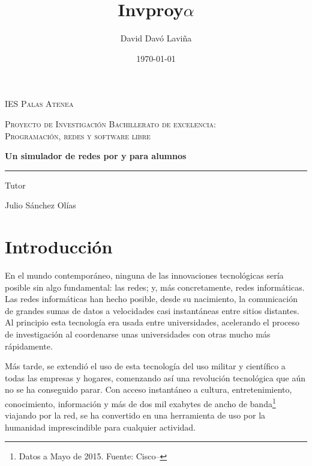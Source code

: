 \documentclass[a4paper, 11pt]{report} %
\title{Invproy\space $\alpha$}
\author{David Davó Laviña}
\date{\today{}}
\begin{document}

\makeatletter
\begin{titlepage}
\centering
\vspace*{4cm}
{\scshape\LARGE IES Palas Atenea \par}
\vspace{1cm}
{\scshape\Large Proyecto de Investigación Bachillerato de excelencia:\\
Programación, redes y software libre\par}
\vspace{1.5cm}
{\fontsize{35pt}{40pt}\bfseries\color{DarkRed} \@title\par}
{\huge\bfseries Un simulador de redes por y para alumnos \par}
\rule{0.5\textwidth}{1pt}\par
\vspace{2cm}
{\Large\itshape \@author\par}
\vfill
Tutor\par
Julio Sánchez Olías

\vfill

{\large \@date\par}
\end{titlepage}
\clearpage
{}

\tableofcontents
{}
\newpage{}
\setlength{\parskip}{5pt plus4pt minus3pt}

\chapter*{Introducción}
En el mundo contemporáneo, ninguna de las innovaciones tecnológicas sería posible sin algo fundamental: las redes; y, más concretamente, redes informáticas. Las redes informáticas han hecho posible, desde su nacimiento, la comunicación de grandes sumas de datos a velocidades casi instantáneas entre sitios distantes. Al principio esta tecnología era usada entre universidades, acelerando el proceso de investigación al coordenarse unas universidades con otras mucho más rápidamente. 

Más tarde, se extendió el uso de esta tecnología del uso militar y científico a todas las empresas y hogares, comenzando así una revolución tecnológica que aún no se ha conseguido parar. Con acceso instantáneo a cultura, entretenimiento, conocimiento, información y más de dos mil exabytes de ancho de banda\footnote{Datos a Mayo de 2015. Fuente: Cisco--\cite{Cisco}} viajando por la red, se ha convertido en una herramienta de uso por la humanidad imprescindible para cualquier actividad.
\end{document}
